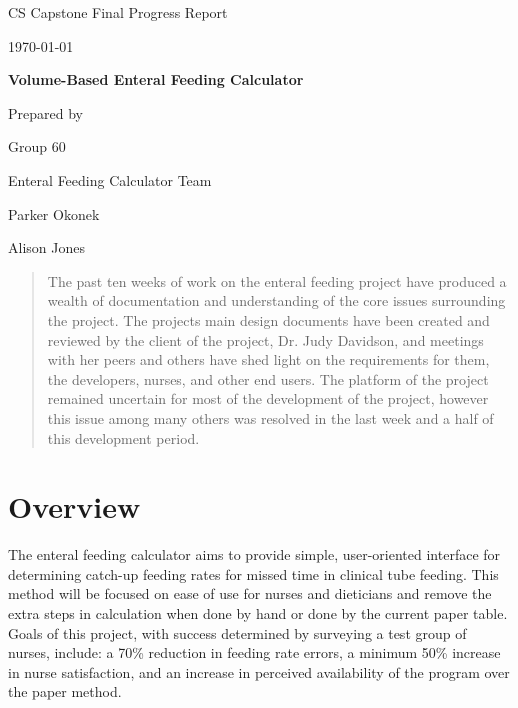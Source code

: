 \documentclass[onecolumn, draftclsnofoot,10pt, compsoc]{IEEEtran}
\def \CapstoneTeamName{		Enteral Feeding Calculator Team}
\def \CapstoneTeamNumber{		60}
\def \GroupMemberTwo{			Alison Jones}
\def \GroupMemberOne{			Parker Okonek}
\def \CapstoneProjectName{		Volume-Based Enteral Feeding Calculator}
\def \CapstoneSponsorPerson{		Dr. Judy Davidson}
\def \DocType{
				Final Progress Report
				}
\newcommand{\NameSigPair}[1]{\par
\makebox[2.75in][r]{#1} \hfil 	\makebox[3.25in]{\makebox[2.25in]{\hrulefill} \hfill		\makebox[.75in]{\hrulefill}}
\par\vspace{-12pt} \textit{\tiny\noindent
\makebox[2.75in]{} \hfil		\makebox[3.25in]{\makebox[2.25in][r]{Signature} \hfill	\makebox[.75in][r]{Date}}}}
\renewcommand{\NameSigPair}[1]{#1}
\begin{document}
\begin{titlepage}
    \begin{singlespace}
        \hfill 
        \par\vspace{.2in}
        \centering
        \scshape{
            \huge CS Capstone \DocType \par
            {\large\today}\par
            \vspace{.5in}
            \textbf{\Huge\CapstoneProjectName}\par
            \vfill
            {\large Prepared by }\par
            Group\CapstoneTeamNumber\par
            \CapstoneTeamName\par 
            \vspace{5pt}
            {\Large
                \NameSigPair{\GroupMemberOne}\par
                \NameSigPair{\GroupMemberTwo}\par
            }
            \vspace{20pt}
        }
        \begin{abstract}%
        The past ten weeks of work on the enteral feeding project have produced a wealth of documentation and understanding of the core issues surrounding the project.
        The projects main design documents have been created and reviewed by the client of the project, Dr. Judy Davidson, and meetings with her peers and others have shed light on the requirements for them, the developers, nurses, and other end users.
        The platform of the project remained uncertain for most of the development of the project, however this issue among many others was resolved in the last week and a half of this development period.
        \end{abstract}     
    \end{singlespace}
\end{titlepage}
\newpage
{}
\clearpage
\section{Overview}
The enteral feeding calculator aims to provide simple, user-oriented interface for determining catch-up feeding rates for missed time in clinical tube feeding.
This method will be focused on ease of use for nurses and dieticians and remove the extra steps in calculation when done by hand or done by the current paper table.
Goals of this project, with success determined by surveying a test group of nurses, include: a 70\% reduction in feeding rate errors, a minimum 50\% increase in nurse satisfaction, and an increase in perceived availability of the program over the paper method.
\end{document}
